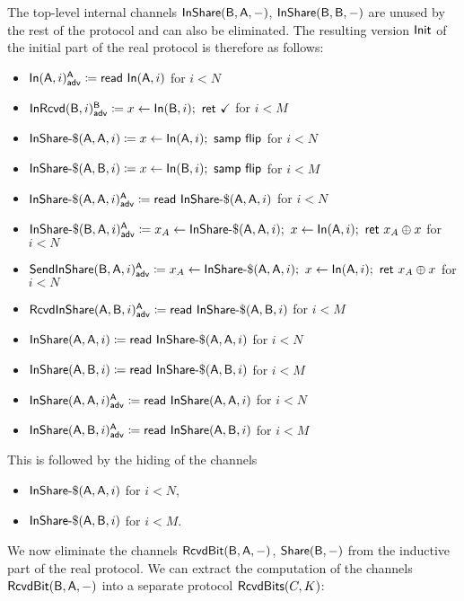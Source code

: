 \noindent The top-level internal channels $\InShare(\B,\A,-)$, $\InShare(\B,\B,-)$ are unused by the rest of the protocol and can also be eliminated. The resulting version $\Init$ of the initial part of the real protocol is therefore as follows:

\begin{itemize}
\item {\color{blue} $\LeakIn(\A,i)^\A_\adv \coloneqq \read{\In(\A,i)}$ for $i < N$}
\item {\color{blue} $\LeakInRcvd(\B,i)^\B_\adv \coloneqq x \leftarrow \In(\B,i); \ \ret{\checkmark}$ for $i < M$}
\item $\InShareGen(\A,\A,i) \coloneqq x \leftarrow \In(\A,i); \ \samp{\flip}$ for $i < N$
\item $\InShareGen(\A,\B,i) \coloneqq x \leftarrow \In(\B,i); \ \samp{\flip}$ for $i < M$
\item {\color{blue} $\LeakInShareGen(\A,\A,i)^\A_\adv \coloneqq \read{\InShareGen(\A,\A,i)}$ for $i < N$}
\item {\color{blue} $\LeakInShareGen(\B,\A,i)^\A_\adv \coloneqq x_A \leftarrow \InShareGen(\A,\A,i); \ x \leftarrow \In(\A,i); \ \ret{x_A \oplus x}$ for $i < N$}
\item {\color{blue} $\LeakSendInShare(\B,\A,i)^\A_\adv \coloneqq x_A \leftarrow \InShareGen(\A,\A,i); \ x \leftarrow \In(\A,i); \ \ret{x_A \oplus x}$ for $i < N$}
\item {\color{blue} $\LeakRcvdInShare(\A,\B,i)^\A_\adv \coloneqq \read{\InShareGen(\A,\B,i)}$ for $i < M$}
\item $\InShare(\A,\A,i) \coloneqq \read{\InShareGen(\A,\A,i)}$ for $i < N$
\item $\InShare(\A,\B,i) \coloneqq \read{\InShareGen(\A,\B,i)}$ for $i < M$
\item {\color{blue} $\LeakInShare(\A,\A,i)^\A_\adv \coloneqq \read{\InShare(\A,\A,i)}$ for $i < N$}
\item {\color{blue} $\LeakInShare(\A,\B,i)^\A_\adv \coloneqq \read{\InShare(\A,\B,i)}$ for $i < M$}
\end{itemize}
This is followed by the hiding of the channels
\begin{itemize}
\item $\InShareGen(\A,\A,i)$ for $i < N$,
\item $\InShareGen(\A,\B,i)$ for $i < M$.
\end{itemize}

\noindent We now eliminate the channels $\RcvdBit(\B,\A,-)$, $\Share(\B,-)$ from the inductive part of the real protocol. We can extract the computation of the channels $\RcvdBit(\B,\A,-)$ into a separate protocol $\RcvdBits(C,K)$:

